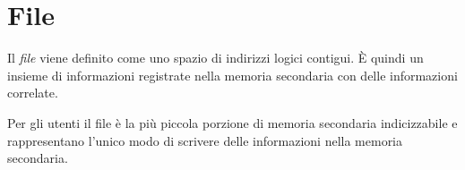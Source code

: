 \chapter{File}

Il \textit{file} viene definito come uno spazio di indirizzi logici contigui. È quindi un insieme di informazioni registrate nella memoria secondaria con delle informazioni correlate.

\spacer
Per gli utenti il file è la più piccola porzione di memoria secondaria indicizzabile e rappresentano l'unico modo di scrivere delle informazioni nella memoria secondaria.





